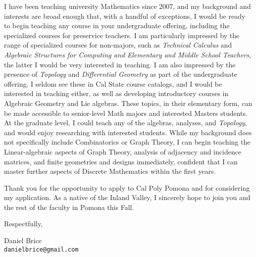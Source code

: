 \documentclass[10pt]{article}
\begin{document}
I have been teaching university Mathematics since 2007, and my
background and interests are broad enough that, with a handful of
exceptions, I would be ready to begin teaching any course in your
undergraduate offering, including the specialized courses for preservice
teachers. I am particularly impressed by the range of specialized
courses for non-majors, such as \emph{Technical Calculus} and
\emph{Algebraic Structures for Computing and Elementary and Middle
School Teachers}, the latter I would be very interested in teaching. I
am also impressed by the presence of \emph{Topology} and
\emph{Differential Geometry} as part of the undergraduate offering. I
seldom see these in Cal State course catalogs, and I would be interested
in teaching either, as well as developing introductory courses in
Algebraic Geometry and Lie algebras. These topics, in their elementary
form, can be made accessible to senior-level Math majors and interested
Masters students. At the graduate level, I could teach any of the
algebras, analyses, and \emph{Topology}, and would enjoy researching
with interested students. While my background does not specifically
include Combinatorics or Graph Theory, I can begin teaching the
Linear-algebraic
aspects of Graph Theory, analysis of adjacency and incidence
matrices, and finite geometries and designs immediately,
confident that I can master further aspects of Discrete
Mathematics within the first years.


Thank you for the opportunity to apply to Cal Poly Pomona and for
considering my application. As a native of the Inland Valley, I
sincerely hope to join you and the rest of the faculty in Pomona this
Fall.

\vfill

Respectfully,

\vfill

Daniel Brice\\
\texttt{danielbrice@gmail.com}

\label{page:last}
\end{document}
